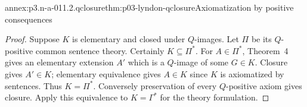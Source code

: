 \begin{annexitem}{annex:p3.n-a-011.2.qclosure}{thm:p03-lyndon-qclosure}{Axiomatization by positive consequences}
\begin{proof}
Suppose \(K\) is elementary and closed under \(Q\)-images. Let
\(\Pi\) be its \(Q\)-positive common sentence theory. Certainly
\(K\subseteq\Pi^*\). For \(A\in\Pi^*\), Theorem~4 gives an
elementary extension \(A'\) which is a \(Q\)-image of some \(G\in K\).
Closure gives \(A'\in K\); elementary equivalence gives \(A\in K\)
since \(K\) is axiomatized by sentences. Thus \(K=\Pi^*\).
Conversely preservation of every \(Q\)-positive axiom gives closure.
Apply this equivalence to \(K=\Gamma^*\) for the theory formulation.
\end{proof}
\end{annexitem}

